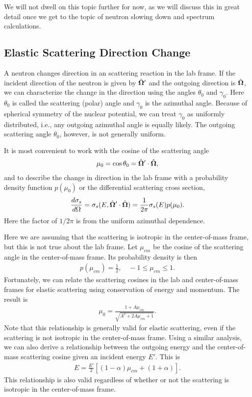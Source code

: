 We will not dwell on this topic further for now, as we will discuss this in great detail once we get to the topic of neutron slowing down and spectrum calculations. 

\subsection{Elastic Scattering Direction Change}

A neutron changes direction in an scattering reaction in the lab frame. If the incident direction of the neutron is given by $\hat{\mathbf{\Omega}}'$ and the outgoing direction is $\hat{\mathbf{\Omega}}$, we can characterize the change in the direction using the angles $\theta_0$ and $\gamma_0$. Here $\theta_0$ is called the scattering (polar) angle and $\gamma_0$ is the azimuthal angle. Because of spherical symmetry of the nuclear potential, we can treat $\gamma_0$ as uniformly distributed, i.e., any outgoing azimuthal angle is equally likely. The outgoing scattering angle $\theta_0$, however, is not generally uniform.

It is most convenient to work with the cosine of the scattering angle
\begin{align}
  \mu_0 = \cos\theta_0 = \hat{\mathbf{\Omega}}' \cdot \hat{\mathbf{\Omega}} ,
\end{align}
and to describe the change in direction in the lab frame with a probability density function $p(\mu_0)$ or the differential scattering cross section,
\begin{align}
  \frac{d\sigma_s}{d\Omega} = \sigma_s( E, \hat{\mathbf{\Omega}}' \cdot \hat{\mathbf{\Omega}} ) = \frac{1}{2\pi} \sigma_s(E) p(\mu_0).
\end{align}
Here the factor of $1/2\pi$ is from the uniform azimuthal dependence.

Here we are assuming that the scattering is isotropic in the center-of-mass frame, but this is not true about the lab frame. Let $\mu_{cm}$ be the cosine of the scattering angle in the center-of-mass frame. Its probability density is then
\begin{align}
  p(\mu_{cm}) = \frac{1}{2}, \quad -1 \le \mu_{cm} \le 1.
\end{align}
Fortunately, we can relate the scattering cosines in the lab and center-of-mass frames for elastic scattering using conservation of energy and momentum. The result is
\begin{align} \label{Eq:nuclearData_LabFrameCosine_COMFrameCosine}
  \mu_0 = \frac{ 1 + A \mu_{cm} }{ \sqrt{ A^2 + 2 A \mu_{cm} + 1 } } .
\end{align}
Note that this relationship is generally valid for elastic scattering, even if the scattering is not isotropic in the center-of-mass frame. Using a similar analysis, we can also derive a relationship between the outgoing energy and the center-of-mass scattering cosine given an incident energy $E'$. This is
\begin{align}
  E = \frac{E'}{2} \left[ ( 1 - \alpha ) \mu_{cm} + ( 1 + \alpha ) \right] .
\end{align}
This relationship is also valid regardless of whether or not the scattering is isotropic in the center-of-mass frame. 

